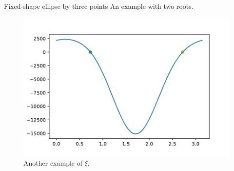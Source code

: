 \documentclass{beamer}
\begin{document}
\begin{frame}{Fixed-shape ellipse by three points}
	An example with two roots.
	\begin{figure}
		\centering
		
		\includegraphics[scale=.5]{012}
		\caption{Another example of $\xi$.}
	\end{figure}
\end{frame}

	
\end{document}
